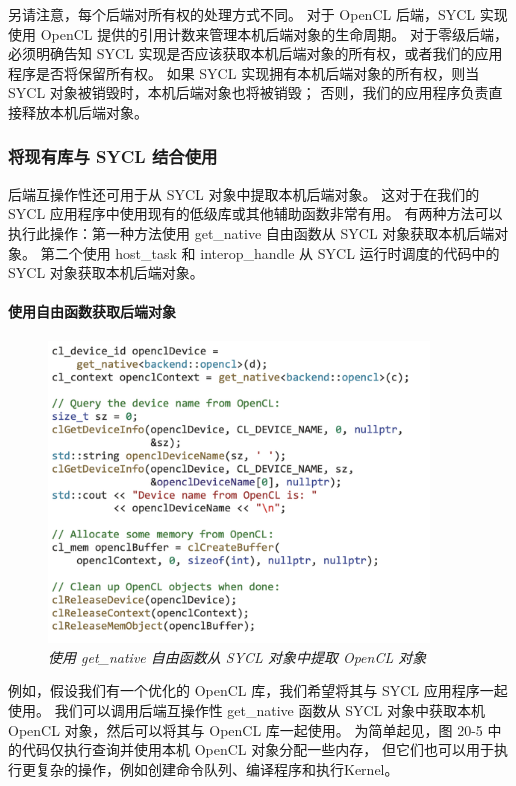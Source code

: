 另请注意，每个后端对所有权的处理方式不同。 
对于 OpenCL 后端，SYCL 实现使用 OpenCL 提供的引用计数来管理本机后端对象的生命周期。 
对于零级后端，必须明确告知 SYCL 实现是否应该获取本机后端对象的所有权，或者我们的应用程序是否将保留所有权。 
如果 SYCL 实现拥有本机后端对象的所有权，则当 SYCL 对象被销毁时，本机后端对象也将被销毁； 
否则，我们的应用程序负责直接释放本机后端对象。

\subsubsection{将现有库与 SYCL 结合使用}
后端互操作性还可用于从 SYCL 对象中提取本机后端对象。 
这对于在我们的 SYCL 应用程序中使用现有的低级库或其他辅助函数非常有用。 
有两种方法可以执行此操作：第一种方法使用 get\_native 自由函数从 SYCL 对象获取本机后端对象。 
第二个使用 host\_task 和 interop\_handle 从 SYCL 运行时调度的代码中的 SYCL 对象获取本机后端对象。

\paragraph{使用自由函数获取后端对象}

\begin{figure}[H]
	\centering
	\includegraphics[width=0.9\textwidth]{figs/F20.5.png}
	\caption{\textit{使用 get\_native 自由函数从 SYCL 对象中提取 OpenCL 对象 }}
\end{figure}

例如，假设我们有一个优化的 OpenCL 库，我们希望将其与 SYCL 应用程序一起使用。 
我们可以调用后端互操作性 get\_native 函数从 SYCL 对象中获取本机 OpenCL 对象，然后可以将其与 OpenCL 库一起使用。 
为简单起见，图 20-5 中的代码仅执行查询并使用本机 OpenCL 对象分配一些内存，
但它们也可以用于执行更复杂的操作，例如创建命令队列、编译程序和执行Kernel。

